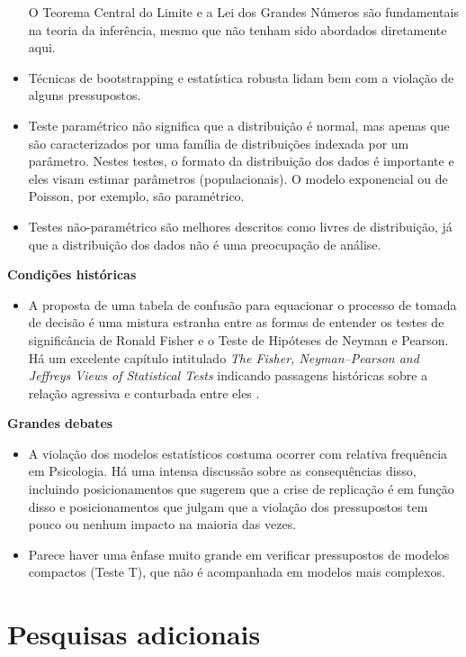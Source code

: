 \documentclass[
]{book}
\providecommand{\tightlist}{%
  \setlength{\itemsep}{0pt}\setlength{\parskip}{0pt}}
\begin{document}
\begin{itemize}
  O Teorema Central do Limite e a Lei dos Grandes Números são fundamentais na teoria da inferência, mesmo que não tenham sido abordados diretamente aqui.
\item
  Técnicas de bootstrapping e estatística robusta lidam bem com a violação de alguns pressupostos.
\item
  Teste paramétrico não significa que a distribuição é normal, mas apenas que são caracterizados por uma família de distribuições indexada por um parâmetro. Nestes testes, o formato da distribuição dos dados é importante e eles visam estimar parâmetros (populacionais). O modelo exponencial ou de Poisson, por exemplo, são paramétrico.
\item
  Testes não-paramétrico são melhores descritos como livres de distribuição, já que a distribuição dos dados não é uma preocupação de análise.
\end{itemize}

\textbf{Condições históricas}

\begin{itemize}
\tightlist
\item
  A proposta de uma tabela de confusão para equacionar o processo de tomada de decisão é uma mistura estranha entre as formas de entender os testes de significância de Ronald Fisher e o Teste de Hipóteses de Neyman e Pearson. Há um excelente capítulo intitulado \emph{The Fisher, Neyman--Pearson and Jeffreys Views of Statistical Tests} indicando passagens históricas sobre a relação agressiva e conturbada entre eles \citep{Lecoutre2014}.
\end{itemize}

\textbf{Grandes debates}

\begin{itemize}
\item
  A violação dos modelos estatísticos costuma ocorrer com relativa frequência em Psicologia. Há uma intensa discussão sobre as consequências disso, incluindo posicionamentos que sugerem que a crise de replicação é em função disso e posicionamentos que julgam que a violação dos pressupostos tem pouco ou nenhum impacto na maioria das vezes.
\item
  Parece haver uma ênfase muito grande em verificar pressupostos de modelos compactos (Teste T), que não é acompanhada em modelos mais complexos.
\end{itemize}

\hypertarget{pesquisas-adicionais}{%
\section{Pesquisas adicionais}\label{pesquisas-adicionais}}
\end{document}
